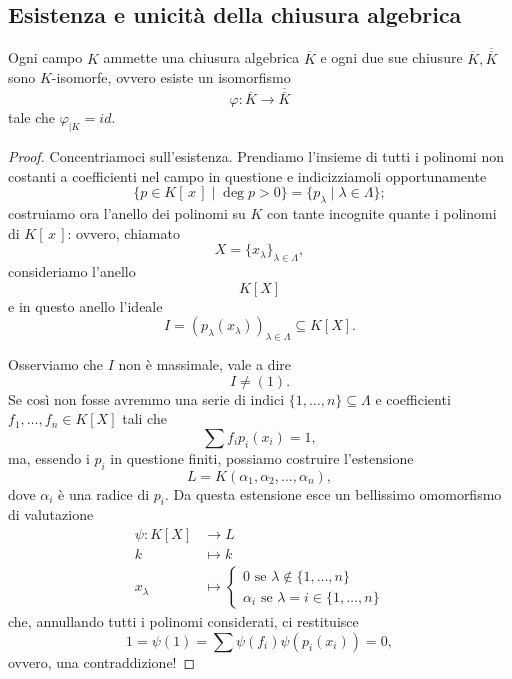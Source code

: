 \subsection{Esistenza e unicità della chiusura algebrica}
\begin{multicols}{2}
	\setcounter{theorem}{4}
	\begin{theorem}
		Ogni campo $ K $ ammette una chiusura algebrica $ \overline{K} $ e ogni due sue chiusure $ \overline{K}, \overline{\overline{K}} $ sono $ K $-isomorfe, ovvero esiste un isomorfismo
		\[ \varphi : \overline{K} \to \overline{\overline{K}} \]
		tale che $ \varphi_{|K} = id $.
	\end{theorem}

\begin{proof}
	Concentriamoci sull'esistenza. Prendiamo l'insieme di tutti i polinomi non costanti a coefficienti nel campo in questione e indicizziamoli opportunamente
	$$  \{ p \in K[\,x\,] \mid \deg p > 0 \} = \{p_\lambda \mid \lambda \in \Lambda\};  $$
	costruiamo ora l'anello dei polinomi su $ K $ con tante incognite quante i polinomi di $ K[\,x\,] $: ovvero, chiamato
	\[ X = \{ x_\lambda \}_{\lambda \in \Lambda}, \]
	consideriamo l'anello
	\[ K[X] \]
	e in questo anello l'ideale
	\[ I = (p_{\lambda}(x_{\lambda}))_{\lambda \in \Lambda} \subseteq K[X]. \]
	
	Osserviamo che $ I $ non è massimale, vale a dire
	\[ I \neq (1). \]
	Se così non fosse avremmo una serie di indici $ \{1, \dots, n\} \subseteq \Lambda $ e coefficienti $ f_1, \dots, f_n \in K[X] $ tali che
	\[ \sum f_i p_i(x_i) = 1, \]
	ma, essendo i $ p_i $ in questione finiti, possiamo costruire l'estensione 
	$$  L = K(\alpha_1, \alpha_2, \dots, \alpha_n),  $$
	dove $ \alpha_i $ è una radice di $ p_i $.
	Da questa estensione esce un bellissimo omomorfismo di valutazione
	\begin{align*}
	\psi \colon K[X] &\to L \\
	k &\mapsto k \\
	x_\lambda &\mapsto \begin{cases}
	0 \text{ se } \lambda \notin \{1, \dots, n\}\\
	\alpha_i \text{ se } \lambda = i \in \{1, \dots, n\}
	\end{cases} 
	\end{align*}
	che, annullando tutti i polinomi considerati, ci restituisce
	\[ 1 = \psi(1) = \sum \psi(f_i)\psi(p_i(x_i)) = 0, \]
	ovvero, una contraddizione!
	

\end{proof}
\end{multicols}
